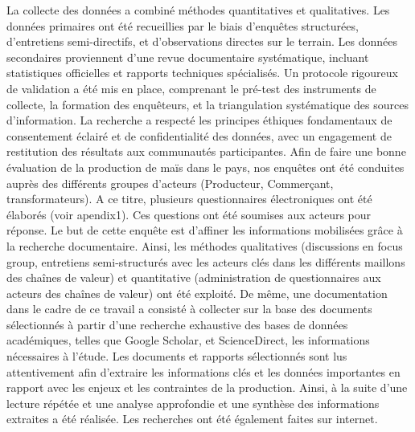 \documentclass[12pt,oneside]{report}
\begin{document}
La collecte des données a combiné méthodes quantitatives et qualitatives. Les données primaires ont été recueillies par le biais d'enquêtes structurées, d'entretiens semi-directifs, et d'observations directes sur le terrain. Les données secondaires proviennent d'une revue documentaire systématique, incluant statistiques officielles et rapports techniques spécialisés. Un protocole rigoureux de validation a été mis en place, comprenant le pré-test des instruments de collecte, la formation des enquêteurs, et la triangulation systématique des sources d'information. La recherche a respecté les principes éthiques fondamentaux de consentement éclairé et de confidentialité des données, avec un engagement de restitution des résultats aux communautés participantes. Afin de faire une bonne évaluation de la production de maïs dans le pays, nos enquêtes ont été conduites auprès des différents groupes d’acteurs (Producteur, Commerçant, transformateurs). A ce titre, plusieurs questionnaires électroniques ont été élaborés (voir apendix1). Ces questions ont été soumises aux acteurs pour réponse. Le but de cette enquête est d’affiner les informations mobilisées grâce à la recherche documentaire. Ainsi, les méthodes qualitatives (discussions en focus group, entretiens semi-structurés avec les acteurs clés dans les différents maillons des chaînes de valeur) et quantitative (administration de questionnaires aux acteurs des chaînes de valeur) ont été exploité. De même, une documentation dans le cadre de ce travail a consisté à collecter sur la base des documents sélectionnés à partir d’une recherche exhaustive des bases de données académiques, telles que Google Scholar, et ScienceDirect, les informations nécessaires à l’étude. Les documents et rapports sélectionnés sont lus attentivement afin d'extraire les informations clés et les données importantes en rapport avec les enjeux et les contraintes de la production. Ainsi, à la suite d’une lecture répétée et une analyse approfondie et une synthèse des informations extraites a été réalisée. Les recherches ont été également faites sur internet.
\end{document}

